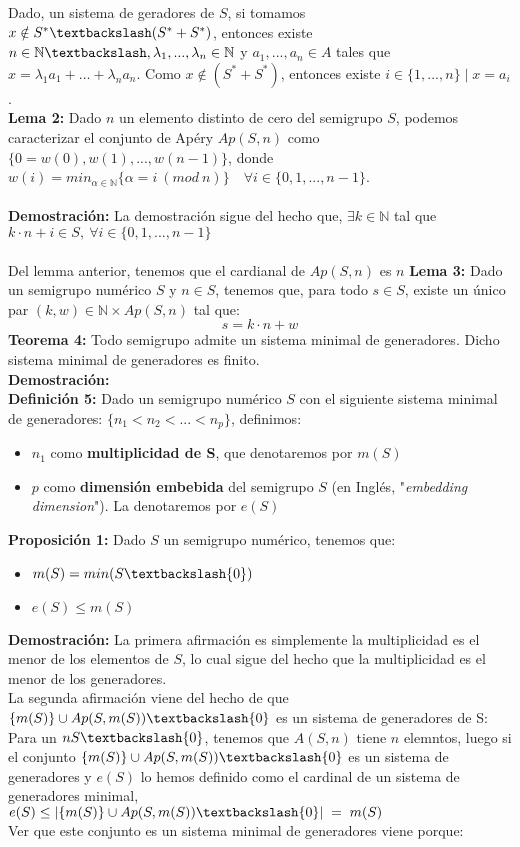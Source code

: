 \documentclass[10pt,spanish]{book}
\begin{document}
Dado, un sistema de geradores de $S$, si tomamos $x\notin S^{*}\textbackslash (S^{*}+S^{*})$, entonces existe $n\in \mathbb{N}\textbackslash, \lambda_{1},...,\lambda_{n}\in\mathbb{N}$ y $a_{1},...,a_{n}\in A$ tales que $x=\lambda_{1}a_{1}+...+\lambda_{n}a_{n}$. Como $x\notin (S^{*}+S^{*})$, entonces existe $i\in\{1,...,n\}\; |\; x=a_{i}$.\\
\textbf{Lema 2: } Dado $n$ un elemento distinto de cero del semigrupo $S$, podemos caracterizar el conjunto de Apéry $Ap(S,n)$ como $\{0=w(0), w(1),...,w(n-1)\}$, donde $w(i) = min_{\alpha\in\mathbb{N}}\{\alpha = i\:(mod\: n)\}\quad \forall i\in\{0,1,...,n-1\}$. \\
\\ \textbf{Demostración:} La demostración sigue del hecho que,  $\exists k\in \mathbb{N}$ tal que $k\cdot n + i \in S,\: \forall i\in \{0,1,...,n-1\}$ \\
\\Del lemma anterior, tenemos que el cardianal de $Ap(S, n)$ es $n$
\textbf{Lema 3: } Dado un semigrupo numérico $S$ y $n\in S$, tenemos que, para todo $s\in S$, existe un único par $(k,w)\in \mathbb{N}\times Ap(S,n)$ tal que:
$$s=k\cdot n + w$$  
\textbf{Teorema 4: } Todo semigrupo admite un sistema minimal de generadores. Dicho sistema minimal de generadores es finito. \\
\textbf{Demostración: } 
\\ \textbf{Definición 5:} Dado un semigrupo numérico $S$ con el siguiente sistema minimal de generadores: $\{n_{1}<n_{2}<...<n_{p}\}$, definimos:
\begin{itemize}
	\item $n_{1}$ como \textbf{multiplicidad de S}, que denotaremos por $m(S)$
	\item $p$ como \textbf{dimensión embebida} del semigrupo $S$ (en Inglés, "\textit{embedding dimension}"). La denotaremos por $e(S)$
\end{itemize}
\textbf{Proposición 1:} Dado $S$ un semigrupo numérico, tenemos que:
\begin{itemize}
	\item $m(S) = min(S\textbackslash \{0\})$
	\item $e(S)\leq m(S)$
\end{itemize} 
\textbf{Demostración:} La primera afirmación es simplemente la multiplicidad es el menor de los elementos de $S$, lo cual sigue del hecho que la multiplicidad es el menor de los generadores. \\
La segunda afirmación viene del hecho de que $\{m(S)\}\cup Ap(S,m(S))\textbackslash\{0\}$ es un sistema de generadores de S:\\
Para un $n S \textbackslash \{0\}$, tenemos que $A(S,n)$ tiene $n$ elemntos, luego si el conjunto $\{m(S)\}\cup Ap(S,m(S))\textbackslash\{0\}$ es un sistema de generadores y $e(S)$ lo hemos definido como el cardinal de un sistema de generadores minimal, $e(S)\leq | \{m(S)\}\cup Ap(S,m(S))\textbackslash\{0\}|\;=\;m(S)$ \\ 
Ver que este conjunto es un sistema minimal de generadores viene porque: 
\end{document}
